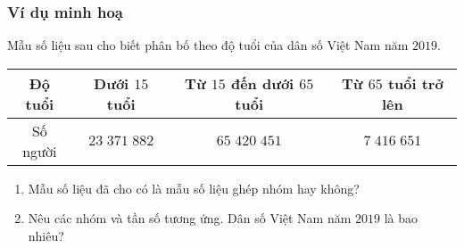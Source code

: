 \subsubsection{Ví dụ minh hoạ}
\begin{vd}%
	Mẫu số liệu sau cho biết phân bố theo độ tuổi của dân số Việt Nam năm $2019$.
	\begin{center}
		\begin{tabular}{|c|c|c|c|}
			\hline
			Độ tuổi&Dưới $15$ tuổi&Từ $15$ đến dưới $65$ tuổi&Từ $65$ tuổi trở lên\\
			\hline
			Số người& $23\;371\;882$&$65\;420\;451$&$7\;416\;651$\\
			\hline
		\end{tabular}
	\end{center}
	\begin{enumerate}
		\item Mẫu số liệu đã cho có là mẫu số liệu ghép nhóm hay không?
		\item Nêu các nhóm và tần số tương ứng. Dân số Việt Nam năm $2019$ là bao nhiêu?
	\end{enumerate}
\end{vd}

